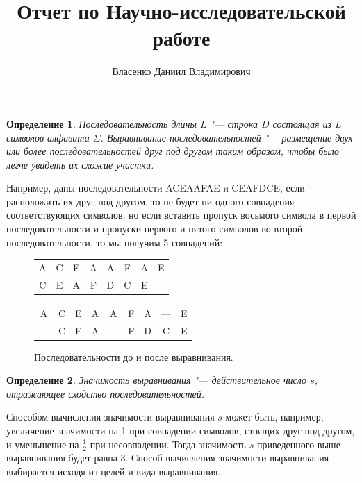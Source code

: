 \documentclass[specialist,
substylefile = spbu_report.rtx,
subf,href,colorlinks=true, 12pt]{disser}
\newtheorem{defenition}{Определение}
\begin{document}
	
	\title{Отчет по Научно-исследовательской работе}	
	\author{Власенко Даниил Владимирович}
	\date{\number\year}	
	\maketitle
	\tableofcontents
	
	
	\intro
		\begin{defenition}
		Последовательность длины $L$ "--- строка $D$ состоящая из $L$ символов алфавита $\Sigma$. Выравнивание последовательностей  "--- размещение двух или более последовательностей друг под другом таким образом, чтобы было легче увидеть их схожие участки. 
		\end{defenition}
		Например, даны последовательности ACEAAFAE и CEAFDCE, если расположить их друг под другом, то не будет ни одного совпадения соответствующих символов, но если вставить пропуск восьмого символа в первой последовательности и пропуски первого и пятого символов во второй последовательности, то мы получим 5 совпадений:
		
		\begin{figure}[h]
			\centering			
			\begin{tabular}{cccccccc}
				A&C&E&A&A&F&A&E\\
				C&E&A&F&D&C&E&\\
			\end{tabular}
		\end{figure}
		\begin{figure}[h]
			\centering			
			\begin{tabular}{ccccccccc}
				A&C&E&A&A&F&A&—&E\\
				—&C&E&A&—&F&D&C&E\\
			\end{tabular}
		\caption{Последовательности до и после выравнивания.} \label{fg:1}
		\end{figure}
	
		\begin{defenition}
			Значимость выравнивания "--- действительное число $s$, отражающее сходство последовательностей. 
		\end{defenition}
		Способом вычисления значимости выравнивания $s$ может быть, например, увеличение значимости на 1 при совпадении символов, стоящих друг под другом, и уменьшение на $\frac{1}{2}$ при несовпадении. Тогда значимость $s$ приведенного выше выравнивания будет равна 3. Способ вычисления значимости выравнивания выбирается исходя из целей и вида выравнивания.
		
\end{document}
